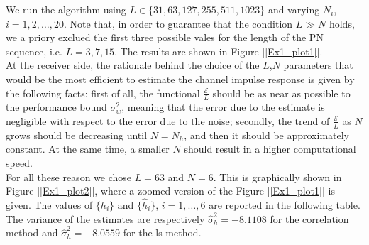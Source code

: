 \documentclass[a4paper, 12pt]{report}
\begin{document}
We run the algorithm using $L\in \{31,63, 127, 255, 511, 1023\}$ and varying $N_i$, $i=1,2,\dots,20$. Note that, in order to guarantee that the condition $L\gg N $ holds, we a priory exclued the first three possible vales for the length of the PN sequence, i.e. $L=3,7,15$. The results are shown in Figure [\ref{Ex1_plot1}].\\
At the receiver side, the rationale behind the choice of the $L$,$N$ parameters that would be the most efficient to estimate the channel impulse response is given by the following facts: first of all, the functional $\frac{\mathcal{E}}{L}$ should be as near as possible to the performance bound $\sigma_w^2$, meaning that the error due to the estimate is negligible with respect to the error due to the noise; secondly, the trend of $\frac{\mathcal{E}}{L}$ as $N$ grows should be decreasing until $N = N_h$, and then it should be approximately constant. At the same time, a smaller $N$ should result in a higher computational speed. \\
For all these reason we chose $L=63$ and $N=6$. This is graphically shown in Figure [\ref{Ex1_plot2}], where a zoomed version of the Figure [\ref{Ex1_plot1}] is given.
The values of $\{h_i\}$ and $\{\hat{h}_i\}$, $i=1,\dots,6$ are reported in the following table. The variance of the estimates are respectively $\hat{\sigma}_h^2 = -8.1108$ for the correlation method and $\hat{\sigma}_h^2 = -8.0559$ for the ls method.


\end{document}
